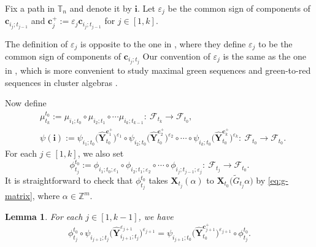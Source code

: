 \documentclass[11pt]{article}
\numberwithin{equation}{section}
\newcommand{\Z}{\mathbb{Z}}
\numberwithin{equation}{section}
\newtheorem{Lemma}[Theorem]{Lemma}
\begin{document}
Fix a path  in $\mathbb{T}_n$ and denote it by $\mathbf{i}$. Let $\varepsilon_{j}$ be the common sign of components of $\mathbf{c}_{i_j;t_{j-1}}$ and $\mathbf{c}_{j}^{+}:=\varepsilon_{j}\mathbf{c}_{i_j;t_{j-1}}$ for $j\in[1,k]$.
\begin{Remark}
 The definition of $\varepsilon_j$ is opposite to the one in \cite{LMN2023}, where they define $\varepsilon_j$ to be the common sign of components of $\mathbf{c}_{i_j;t_j}$
 Our convention of $\varepsilon_{j}$ is the same as the one in \cite{Keller2012}, which is more convenient to study maximal green sequences and green-to-red sequences in cluster algebras \cite{KD2020}.
\end{Remark}
Now define
\begin{align*}
&\mu_{t_k}^{t_0}:=\mu_{i_1;t_0}\circ\mu_{i_2;t_1}\circ\cdots\mu_{i_k;t_{k-1}}\colon\ \mathcal{F}_{t_k}\to\mathcal{F}_{t_0},\\
&\psi(\mathbf{i}):=\psi_{i_1;t_0}\bigl(\mathbf{\hat{Y}}_{t_0}^{\mathbf{c}_{1}^+}\bigr)^{\varepsilon_1}\circ\psi_{i_2;t_0}\bigl(\mathbf{\hat{Y}}_{t_0}^{\mathbf{c}_{2}^+}\bigr)^{\varepsilon_2}\circ\cdots\circ\psi_{i_k;t_0}\bigl(\mathbf{\hat{Y}}_{t_0}^{\mathbf{c}_{k}^+}\bigr)^{\varepsilon_k}\colon\ \mathcal{F}_{t_0}\to\mathcal{F}_{t_0}.
\end{align*}
For each $j\in [1,k]$, we also set
\[
\phi_{t_{j}}^{t_0}:=\phi_{i_1;t_{0};\varepsilon_{1}}\circ\phi_{i_2;t_{1};\varepsilon_{2}}\circ\cdots\circ\phi_{i_j;t_{j-1};\varepsilon_{j}}\colon\ \mathcal{F}_{t_{j}}\to\mathcal{F}_{t_{0}}.
\]
It is straightforward to check that $\phi_{t_{j}}^{t_0}$ takes $\mathbf{X}_{t_{j}}(\alpha)$ to $\mathbf{X}_{t_{0}}\bigl(\tilde{G}_{t_{j}}\alpha\bigr)$ by \eqref{eq:g-matrix}, where $\alpha\in \Z^m$.
\begin{Lemma}\label{l:commutative-diag-isom}
 For each $j\in [1,k-1]$, we have
\[
 \phi_{t_{j}}^{t_{0}}\circ\psi_{i_{j+1};t_{j}}\bigl(\mathbf{\hat{Y}}^{\varepsilon_{j+1}}_{i_{j+1};t_{j}}\bigr)^{\varepsilon_{j+1}}
 =\psi_{i_{j+1};t_{0}}\bigl(\mathbf{\hat{Y}}_{t_{0}}^{\mathbf{c}_{j+1}^{+}}\bigr)^{\varepsilon_{j+1}}\circ\phi_{t_{j}}^{t_{0}}.
 \]
\end{Lemma}
\end{document}
